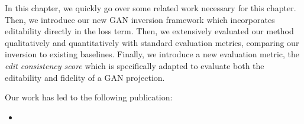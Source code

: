  In this chapter, we quickly go over some related work necessary for this chapter. Then, we 
 introduce our new \ac{GAN} inversion \magec framework 
which incorporates editability directly in the loss term. Then, we extensively evaluated 
our method qualitatively and 
quantitatively with standard evaluation metrics, comparing our \magec  inversion 
to existing baselines. Finally, we introduce a new 
evaluation metric, the \emph{edit consistency score} which is specifically adapted to 
evaluate both the editability and fidelity of a \ac{GAN} projection.

Our work has led to the following publication:
\begin{itemize}
  \item {}
\end{itemize}













